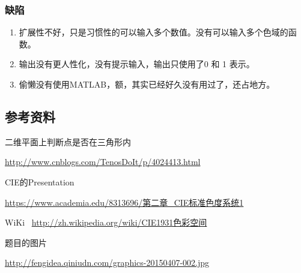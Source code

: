 \documentclass[UTF8]{article}
\begin{document}
\subsubsection{缺陷}

\begin{enumerate}
\item   扩展性不好，只是习惯性的可以输入多个数值。没有可以输入多个色域的函数。
\item   输出没有更人性化，没有提示输入，输出只使用了0 和 1 表示。
\item   偷懒没有使用MATLAB，额，其实已经好久没有用过了，还占地方。
\end{enumerate}

\subsection{参考资料}
二维平面上判断点是否在三角形内~

\url{http://www.cnblogs.com/TenosDoIt/p/4024413.html}

CIE的Presentation~

\url{https://www.academia.edu/8313696/第二章_CIE标准色度系统1}

WiKi~
\url{http://zh.wikipedia.org/wiki/CIE1931色彩空间}

题目的图片~

\url{http://fengidea.qiniudn.com/graphics-20150407-002.jpg}
\end{document}
